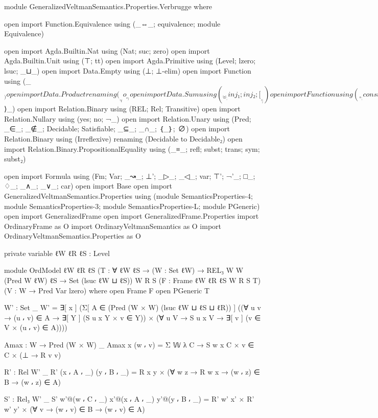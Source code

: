 \begin{spverbatim}
module GeneralizedVeltmanSemantics.Properties.Verbrugge where

open import Function.Equivalence using (_⇔_; equivalence; module Equivalence)

open import Agda.Builtin.Nat using (Nat; suc; zero)
open import Agda.Builtin.Unit using (⊤; tt)
open import Agda.Primitive using (Level; lzero; lsuc; _⊔_)
open import Data.Empty using (⊥; ⊥-elim)
open import Function using (_$_)
open import Data.Product renaming (_,_ to _⸴_)
open import Data.Sum using (_⊎_; inj₁; inj₂; [_,_])
open import Function using (_∘_; const; case_of_; id)
open import Function.Equality using (_⟨$⟩_)
open import Relation.Binary using (REL; Rel; Transitive)
open import Relation.Nullary using (yes; no; ¬_)
open import Relation.Unary using (Pred; _∈_; _∉_; Decidable; Satisfiable; _⊆_; _∩_; ｛_｝; ∅)
open import Relation.Binary using (Irreflexive) renaming (Decidable to Decidable₂)
open import Relation.Binary.PropositionalEquality using (_≡_; refl; subst; trans; sym; subst₂)

open import Formula using (Fm; Var; _↝_; ⊥'; _▷_; _◁_; var; ⊤'; ¬'_; □_; ♢_; _∧_; _∨_; car)
open import Base
open import GeneralizedVeltmanSemantics.Properties
  using (module SemanticsProperties-4;
    module SemanticsProperties-3;
    module SemanticsProperties-L; module PGeneric)
open import GeneralizedFrame
open import GeneralizedFrame.Properties
import OrdinaryFrame as O
import OrdinaryVeltmanSemantics as O
import OrdinaryVeltmanSemantics.Properties as O

private
  variable
    ℓW ℓR ℓS : Level

module OrdModel
  {ℓW ℓR ℓS}
  (T : ∀ {ℓW ℓS} → (W : Set ℓW) → REL₃ W W (Pred W ℓW) ℓS → Set (lsuc ℓW ⊔ ℓS))
  {W R S}
  (F : Frame {ℓW} {ℓR} {ℓS} W R S T)
  (V : W → Pred Var lzero)
  where
  open Frame F
  open PGeneric T

  W' : Set _
  W' = ∃[ x ]
       (Σ[ A ∈ (Pred (W × W) (lsuc ℓW ⊔ ℓS ⊔ ℓR)) ]
       ((∀ {u v} → (u ⸴ v) ∈ A → ∃[ Y ] (S u x Y × v ∈ Y))
       × (∀ {u V} → S u x V → ∃[ v ] (v ∈ V × (u ⸴ v) ∈ A))))

  Amax : W → Pred (W × W) _
  Amax x (w ⸴ v) = Σ 𝕎 λ C → S w x C × v ∈ C × (⊥ → R v v)

  R' : Rel W' _
  R' (x ⸴ A ⸴ _) (y ⸴ B ⸴ _) = R x y × (∀ {w z} → R w x → (w ⸴ z) ∈ B → (w ⸴ z) ∈ A)

  S' : Rel₃ W' _
  S' w'@(w ⸴ C ⸴ _) x'@(x ⸴ A ⸴ _) y'@(y ⸴ B ⸴ _) =
    R' w' x' × R' w' y' × (∀ {v} → (w ⸴ v) ∈ B → (w ⸴ v) ∈ A)


\end{spverbatim}
